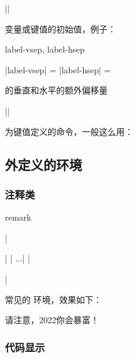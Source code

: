 \documentclass{xdyy-usermanual}
\begin{document}
\begin{function}{\init}
  \begin{syntax}
    ||
  \end{syntax}
  变量或键值的初始值，例子：
\end{function}
\begin{vexample}
    \begin{function}{label-vsep, label-hsep}
      \begin{syntax}
        |label-vsep| =   \init{0pt}
        |label-hsep| =   \init{0pt}
      \end{syntax}
       的垂直和水平的额外偏移量
    \end{function}
\end{vexample}

\begin{function}{\kvopt}
  \begin{syntax}
    ||
  \end{syntax}
  为键值定义的命令，一般这么用：
  \begin{hexample}
  \end{hexample}
\end{function}


\subsection{  外定义的环境}


\subsubsection{ 注释类 }

\begin{function}{remark}
  \begin{syntax}
    |\begin{remark}|
      |  ...|
    |\end{remark}|
  \end{syntax}
  常见的  环境，效果如下：
  \begin{vexample}
    \begin{remark}
      请注意，2022你会暴富！
    \end{remark}
  \end{vexample}
\end{function}



\subsubsection{ 代码显示 }
\end{document}
